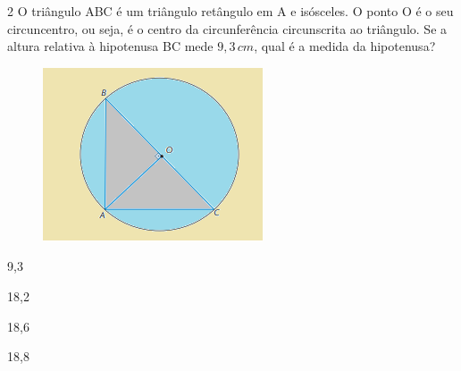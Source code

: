 {{%






\num{2} O triângulo ABC é um triângulo retângulo em A e isósceles. O ponto O
é o seu circuncentro, ou seja, é o centro da circunferência circunscrita
ao triângulo. Se a altura relativa à hipotenusa BC mede $9,3\,cm$, qual é a
medida da hipotenusa?

\begin{figure}[H]
\centering\includegraphics[width=2.5625in,height=2.02083in]{./imgSAEB_8_MAT/media/image35.png}
\end{figure}

\begin{escolha}[itemsep=0pt]
\item 9,3
\item 18,2
\item 18,6 
\item 18,8
\end{escolha}



}}
